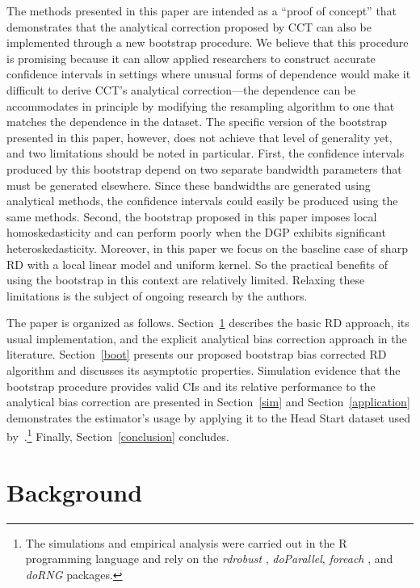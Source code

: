 \documentclass[12pt,fleqn]{article}
\begin{document}
The methods presented in this paper are intended as a ``proof of concept'' that
demonstrates that the analytical correction proposed by CCT can also be
implemented through a new bootstrap procedure. We believe that this procedure is
promising because it can allow applied researchers to construct
accurate confidence intervals in settings where unusual forms of dependence
would make it difficult to derive CCT's analytical correction---the dependence
can be accommodates in principle by modifying the resampling algorithm to one
that matches the dependence in the dataset. The specific version of the bootstrap
presented in this paper, however, does not achieve that level of generality yet,
and two limitations should be noted in particular. First, the confidence
intervals produced by this bootstrap depend on two separate bandwidth parameters
that must be generated elsewhere. Since these bandwidths are generated using
analytical methods, the confidence intervals could easily be produced using the
same methods. Second, the bootstrap proposed in this paper imposes local
homoskedasticity and can perform poorly when the DGP exhibits significant
heteroskedasticity. Moreover, in this paper we focus on the baseline case of
sharp RD with a local linear model and uniform kernel. So the practical benefits
of using the bootstrap in this context are relatively limited. Relaxing these
limitations is the subject of ongoing research by the authors.

The paper is organized as follows. Section~\ref{background} describes the basic
RD approach, its usual implementation, and the explicit analytical bias
correction approach in the literature. Section~\ref{boot} presents our proposed
bootstrap bias corrected RD algorithm and discusses its asymptotic
properties. Simulation evidence that the bootstrap procedure provides valid CIs
and its relative performance to the analytical bias correction are presented in
Section~\ref{sim} and Section~\ref{application} demonstrates the estimator's
usage by applying it to the Head Start dataset used
by~\cite{ludwig2007}.\footnote{%
  The simulations and empirical analysis were carried out in the R programming
  language \citep{R} and rely on the \textit{rdrobust} \citep{rdrobust},
  \textit{doParallel}, \textit{foreach} \citep{doparallel,foreach}, and
  \textit{doRNG} \citep{dorng} packages.} %
Finally, Section~\ref{conclusion} concludes.

\section{Background}\label{background}
\end{document}
